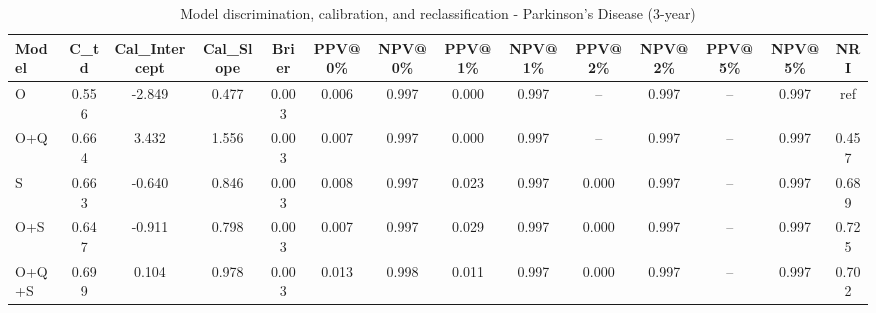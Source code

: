 \begin{table}[htbp]
\centering
\small
\caption{Model discrimination, calibration, and reclassification - Parkinson's Disease (3-year)}
\label{tab:perf_pd_3y}
\begin{tabular}{lccccccccccccc}
\toprule
Model & C\_td & Cal\_Intercept & Cal\_Slope & Brier & PPV@0\% & NPV@0\% & PPV@1\% & NPV@1\% & PPV@2\% & NPV@2\% & PPV@5\% & NPV@5\% & NRI \\
\midrule
O & 0.556 & -2.849 & 0.477 & 0.003 & 0.006 & 0.997 & 0.000 & 0.997 & -- & 0.997 & -- & 0.997 & ref \\
O+Q & 0.664 & 3.432 & 1.556 & 0.003 & 0.007 & 0.997 & 0.000 & 0.997 & -- & 0.997 & -- & 0.997 & 0.457 \\
S & 0.663 & -0.640 & 0.846 & 0.003 & 0.008 & 0.997 & 0.023 & 0.997 & 0.000 & 0.997 & -- & 0.997 & 0.689 \\
O+S & 0.647 & -0.911 & 0.798 & 0.003 & 0.007 & 0.997 & 0.029 & 0.997 & 0.000 & 0.997 & -- & 0.997 & 0.725 \\
O+Q+S & 0.699 & 0.104 & 0.978 & 0.003 & 0.013 & 0.998 & 0.011 & 0.997 & 0.000 & 0.997 & -- & 0.997 & 0.702 \\
\bottomrule
\end{tabular}
\end{table}